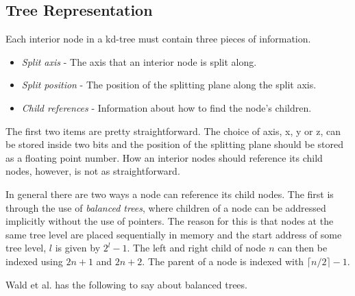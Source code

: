 \subsection{Tree Representation}\label{sec:treeRepresentation}

Each interior node in a kd-tree must contain three pieces of information.

\begin{itemize}
\item \textit{Split axis} - The axis that an interior node is split
  along.
\item \textit{Split position} - The position of the splitting plane
  along the split axis.
\item \textit{Child references} - Information about how to find the
  node's children.
\end{itemize}

The first two items are pretty straightforward. The choice of axis, x,
y or z, can be stored inside two bits and the position of the splitting
plane should be stored as a floating point number. How an interior
nodes should reference its child nodes, however, is not as
straightforward.


In general there are two ways a node can reference its child
nodes. The first is through the use of \textit{balanced trees}, where
children of a node can be addressed implicitly without the use of
pointers. The reason for this is that nodes at the same tree level are
placed sequentially in memory and the start address of some tree
level, $l$ is given by $2^l-1$. The left and right child of node $n$
can then be indexed using $2n+1$ and $2n+2$. The parent of a node is
indexed with $\lceil n/2 \rceil - 1$.


Wald et al. has the following to say about
balanced trees.



